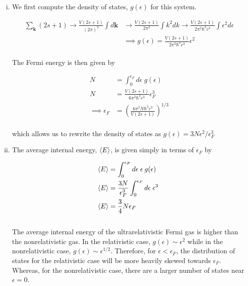 \documentclass[]{article}
\begin{document}
\begin{enumerate}[i.]

\item We first compute the density of states, $g(\epsilon)$ for this system.

\begin{equation}\label{eq:20}
\begin{aligned}
\sum_{\bm{k}}(2s+1) \to \frac{V(2s+1)}{(2\pi)^3} \int d\bm{k} & \to  \frac{V(2s+1)}{2\pi^2} \int k^2 dk \to  \frac{V(2s+1)}{2\pi^2 \hbar^3 c^3} \int \epsilon^2 d\epsilon  \\
& \implies g(\epsilon) =  \frac{V(2s+1)}{2\pi^2 \hbar^3 c^3}  \epsilon^2
\end{aligned}
\end{equation} \\

The Fermi energy is then given by 

\begin{equation}\label{eq:21}
\begin{aligned}
N & = \int_0^{\epsilon_F} d\epsilon \; g(\epsilon) \\
N & =  \frac{V(2s+1)}{6\pi^2 \hbar^3 c^3}    \epsilon_F^3 \\
\implies \epsilon_F & = \left(  \frac{6\pi^2 N \hbar^3 c^3}{V(2s+1)}   \right)^{1/3}
\end{aligned}
\end{equation} \\

which allows us to rewrite the density of states as $g(\epsilon) = 3N \epsilon^2/ \epsilon_F^3$

\item The average internal energy, $\expval{E}$, is given simply in terms of $\epsilon_F$ by

\begin{equation}\label{eq:22}
\begin{aligned}
\expval{E} & = \int_0^{\epsilon_F} d\epsilon \; \epsilon \: g(\epsilon) \\
\expval{E} & = \frac{3N}{\epsilon_F^3 } \int_0^{\epsilon_F} d\epsilon \; \epsilon^3 \:  \\
\expval{E} & = \frac{3}{4 } N \epsilon_F \\
\end{aligned}
\end{equation} \\

The average internal energy of the ultrarelativistic Fermi gas is higher than the nonrelativistic gas. In the relativistic case, $g(\epsilon) \sim \epsilon^2$ while in the nonrelativistic case, $g(\epsilon) \sim \epsilon^{1/2}$. Therefore, for $\epsilon < \epsilon_F$, the distribution of states for the relativistic case will be more heavily skewed towards $\epsilon_F$. Whereas, for the nonrelativistic case, there are a larger number of states near $\epsilon = 0$. \\



\end{enumerate}
\end{document}
